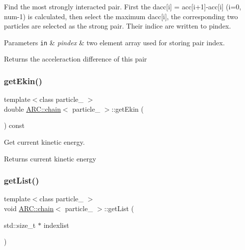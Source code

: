 Find the most strongly interacted pair. First the dacc\mbox{[}i\mbox{]} = acc\mbox{[}i+1\mbox{]}-\/acc\mbox{[}i\mbox{]} (i=0, num-\/1) is calculated, then select the maximum dacc\mbox{[}i\mbox{]}, the corresponding two particles are selected as the strong pair. Their indice are written to pindex. 
\begin{DoxyParams}[1]{Parameters}
\mbox{\tt in}  & {\em pindex} & two element array used for storing pair index. \\
\hline
\end{DoxyParams}
\begin{DoxyReturn}{Returns}
the acceleraction difference of this pair 
\end{DoxyReturn}
\hypertarget{classARC_1_1chain_acfb02b995ba72aef1e9e283d7d04adb8}{}\label{classARC_1_1chain_acfb02b995ba72aef1e9e283d7d04adb8} 
\subsubsection{\texorpdfstring{get\+Ekin()}{getEkin()}}
{\footnotesize\ttfamily template$<$class particle\+\_\+ $>$ \\
double \hyperlink{classARC_1_1chain}{A\+R\+C\+::chain}$<$ particle\+\_\+ $>$\+::get\+Ekin (\begin{DoxyParamCaption}{ }\end{DoxyParamCaption}) const\hspace{0.3cm}{\ttfamily [inline]}}



Get current kinetic energy. 

\begin{DoxyReturn}{Returns}
current kinetic energy 
\end{DoxyReturn}
\hypertarget{classARC_1_1chain_ad5df8eec118fdb768b1f192916c7d9a6}{}\label{classARC_1_1chain_ad5df8eec118fdb768b1f192916c7d9a6} 
\subsubsection{\texorpdfstring{get\+List()}{getList()}}
{\footnotesize\ttfamily template$<$class particle\+\_\+ $>$ \\
void \hyperlink{classARC_1_1chain}{A\+R\+C\+::chain}$<$ particle\+\_\+ $>$\+::get\+List (\begin{DoxyParamCaption}\item[{std\+::size\+\_\+t $\ast$}]{indexlist }\end{DoxyParamCaption})\hspace{0.3cm}{\ttfamily [inline]}}



